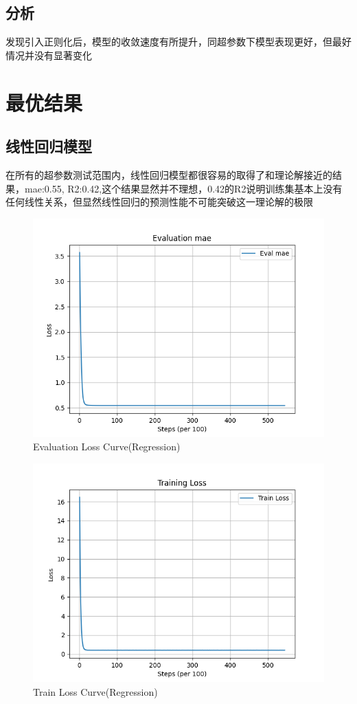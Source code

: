 \documentclass[12pt]{article}
\begin{document}
\subsection{分析}
发现引入正则化后，模型的收敛速度有所提升，同超参数下模型表现更好，但最好情况并没有显著变化                              

\section{最优结果}

\subsection{线性回归模型}
在所有的超参数测试范围内，线性回归模型都很容易的取得了和理论解接近的结果，mae:0.55, R2:0.42,这个结果显然并不理想，0.42的R2说明训练集基本上没有任何线性关系，但显然线性回归的预测性能不可能突破这一理论解的极限
\begin{figure}[H]
    \centering
    \includegraphics[width=\textwidth]{eval_loss_curve_re.png}  %
    \caption{Evaluation Loss Curve(Regression)}
    \label{fig:eval_loss_curve_re}
\end{figure}
\begin{figure}[H]
    \centering
    \includegraphics[width=\textwidth]{train_loss_curve_re.png}  %
    \caption{Train Loss Curve(Regression)}
    \label{fig:train_loss_curve_re}
\end{figure}
\end{document}
